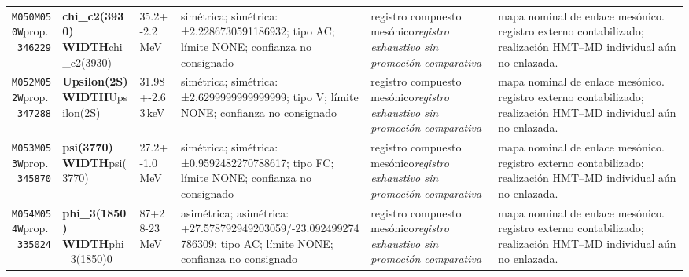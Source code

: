 \begin{landscape}
\begin{longtable}{L{1.85cm}L{4.45cm}L{2.35cm}L{4.05cm}L{3.35cm}L{7.15cm}}
\texttt{M050}\newline \texttt{M050W}\newline prop.\ \texttt{346229} & \textbf{chi\_\allowbreak{}c2(3930) WIDTH}\newline chi\_\allowbreak{}c2(3930) & 35.2+-2.2\,MeV & simétrica; simétrica: ±2.2286730591186932; tipo AC; límite NONE; confianza no consignado & registro compuesto mesónico\newline \emph{registro exhaustivo sin promoción comparativa} & mapa nominal de enlace mesónico. registro externo contabilizado; realización HMT--MD individual aún no enlazada. \\
\texttt{M052}\newline \texttt{M052W}\newline prop.\ \texttt{347288} & \textbf{Upsilon(2S) WIDTH}\newline Upsilon(2S) & 31.98+-2.63\,keV & simétrica; simétrica: ±2.6299999999999999; tipo V; límite NONE; confianza no consignado & registro compuesto mesónico\newline \emph{registro exhaustivo sin promoción comparativa} & mapa nominal de enlace mesónico. registro externo contabilizado; realización HMT--MD individual aún no enlazada. \\
\texttt{M053}\newline \texttt{M053W}\newline prop.\ \texttt{345870} & \textbf{psi(3770) WIDTH}\newline psi(3770) & 27.2+-1.0\,MeV & simétrica; simétrica: ±0.9592482270788617; tipo FC; límite NONE; confianza no consignado & registro compuesto mesónico\newline \emph{registro exhaustivo sin promoción comparativa} & mapa nominal de enlace mesónico. registro externo contabilizado; realización HMT--MD individual aún no enlazada. \\
\texttt{M054}\newline \texttt{M054W}\newline prop.\ \texttt{335024} & \textbf{phi\_\allowbreak{}3(1850) WIDTH}\newline phi\_\allowbreak{}3(1850)0 & 87+28-23\,MeV & asimétrica; asimétrica: +27.578792949203059/-23.092499274786309; tipo AC; límite NONE; confianza no consignado & registro compuesto mesónico\newline \emph{registro exhaustivo sin promoción comparativa} & mapa nominal de enlace mesónico. registro externo contabilizado; realización HMT--MD individual aún no enlazada. \\

\end{longtable}
\end{landscape}
